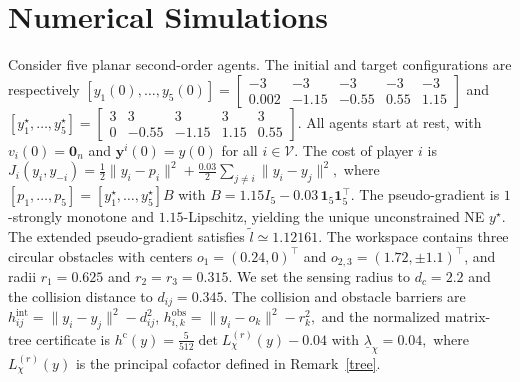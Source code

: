 \section{Numerical Simulations}\label{simulations}

Consider five planar second-order agents. The initial and target
configurations are respectively
$[y_1(0),\ldots,y_5(0)] = \left[\begin{smallmatrix} -3 & -3 & -3 & -3 & -3 \\ 0.002 & -1.15 & -0.55 & 0.55 & 1.15 \end{smallmatrix}\right]$ and $[y_1^\star,\ldots,y_5^\star] = \left[\begin{smallmatrix} 3 & 3 & 3 & 3 & 3 \\ 0 & -0.55 & -1.15 & 1.15 & 0.55 \end{smallmatrix}\right]$.
All agents start at rest, with $v_i(0)=\mathbf 0_n$ and
$\mathbf y^i(0)=y(0)$ for all $i\in\mathcal V$.
The cost of player $i$ is
$
J_i(y_i,y_{-i})
=
\frac12\|y_i-p_i\|^2
+
\frac{0.03}{2}
\sum_{j\ne i}\|y_i-y_j\|^2,
$
where
$
[p_1,\ldots,p_5]
=
[y_1^\star,\ldots,y_5^\star]B$ with $
B=1.15I_5-0.03\,\mathbf 1_5\mathbf 1_5^\top.
$
The pseudo-gradient is $1$-strongly monotone and
$1.15$-Lipschitz, yielding the unique unconstrained NE
$y^\star$. The extended pseudo-gradient satisfies
$\tilde l\simeq1.12161$.
The workspace contains three circular obstacles with centers
$o_1=(0.24,0)^\top$ and
$o_{2,3}=(1.72,\pm1.1)^\top$, and radii
$r_1=0.625$ and $r_2=r_3=0.315$.
We set the sensing radius to $d_c=2.2$ and the collision
distance to $d_{ij}=0.345$.
The collision and obstacle barriers are
$
	h_{ij}^{\mathrm{int}}
	=\|y_i-y_j\|^2-d_{ij}^2$,
	$h_{i,k}^{\mathrm{obs}}
	=\|y_i-o_k\|^2-r_k^2,
$
and the normalized matrix-tree certificate is
$
h^{\mathrm c}(y)
=
\frac{5}{512}\det L_\chi^{(r)}(y)-0.04$
with $
\underline{\lambda}_\chi=0.04,
$
where $L_\chi^{(r)}(y)$ is the principal cofactor
defined in Remark~\ref{tree}.

